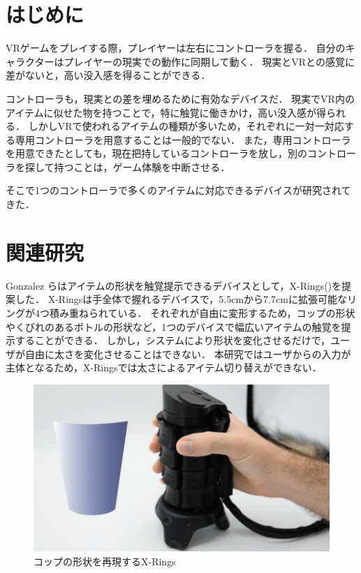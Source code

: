 \documentclass[uplatex]{jsarticle}
\begin{document}
\vspace{3mm}

\setcounter{page}{9}

\section{はじめに}

VRゲームをプレイする際，プレイヤーは左右にコントローラを握る．
自分のキャラクターはプレイヤーの現実での動作に同期して動く．
現実とVRとの感覚に差がないと，高い没入感を得ることができる．

コントローラも，現実との差を埋めるために有効なデバイスだ．
現実でVR内のアイテムに似せた物を持つことで，特に触覚に働きかけ，高い没入感が得られる．
しかしVRで使われるアイテムの種類が多いため，それぞれに一対一対応する専用コントローラを用意することは一般的でない．
また，専用コントローラを用意できたとしても，現在把持しているコントローラを放し，別のコントローラを探して持つことは，ゲーム体験を中断させる．

そこで1つのコントローラで多くのアイテムに対応できるデバイスが研究されてきた．


\section{関連研究}

Gonzalez らはアイテムの形状を触覚提示できるデバイスとして，X-Rings()を提案した\cite{gonzalez2021x-rings}．
X-Ringsは手全体で握れるデバイスで，5.5cmから7.7cmに拡張可能なリングが4つ積み重ねられている．
それぞれが自由に変形するため，コップの形状やくびれのあるボトルの形状など，1つのデバイスで幅広いアイテムの触覚を提示することができる．
しかし，システムにより形状を変化させるだけで，ユーザが自由に太さを変化させることはできない．
本研究ではユーザからの入力が主体となるため，X-Ringsでは太さによるアイテム切り替えができない．

\begin{figure}[htbp]
    \centering
    \includegraphics[width=0.9\linewidth]{fig/X-Rings.png}
    \caption{コップの形状を再現するX-Rings}
    \label{fig:X-Rings}
\end{figure}
\end{document}

